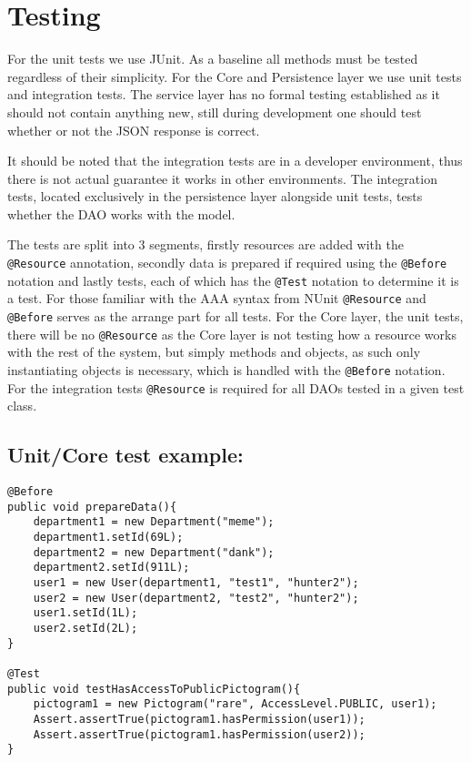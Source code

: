 \newpage
\section{Testing}
For the unit tests we use JUnit.
As a baseline all methods must be tested regardless of their simplicity.
For the Core and Persistence layer we use unit tests and integration tests.
The service layer has no formal testing established as it should not contain anything new, still during development one should test whether or not the JSON response is correct.

It should be noted that the integration tests are in a developer environment, thus there is not actual guarantee it works in other environments.
The integration tests, located exclusively in the persistence layer alongside unit tests, tests whether the DAO works with the model.

The tests are split into 3 segments, firstly resources are added with the \texttt{@Resource} annotation, secondly data is prepared if required using the \texttt{@Before} notation and lastly tests, each of which has the \texttt{@Test} notation to determine it is a test.
For those familiar with the AAA syntax from NUnit \texttt{@Resource} and \texttt{@Before} serves as the arrange part for all tests.
For the Core layer, the unit tests, there will be no \texttt{@Resource} as the Core layer is not testing how a resource works with the rest of the system, but simply methods and objects, as such only instantiating objects is necessary, which is handled with the \texttt{@Before} notation.
For the integration tests \texttt{@Resource} is required for all DAOs tested in a given test class.

\subsection*{Unit/Core test example:}
\begin{lstlisting}
@Before
public void prepareData(){
    department1 = new Department("meme");
    department1.setId(69L);
    department2 = new Department("dank");
    department2.setId(911L);
    user1 = new User(department1, "test1", "hunter2");
    user2 = new User(department2, "test2", "hunter2");
    user1.setId(1L);
    user2.setId(2L);
}

@Test
public void testHasAccessToPublicPictogram(){
    pictogram1 = new Pictogram("rare", AccessLevel.PUBLIC, user1);
    Assert.assertTrue(pictogram1.hasPermission(user1));
    Assert.assertTrue(pictogram1.hasPermission(user2));
}
\end{lstlisting}

